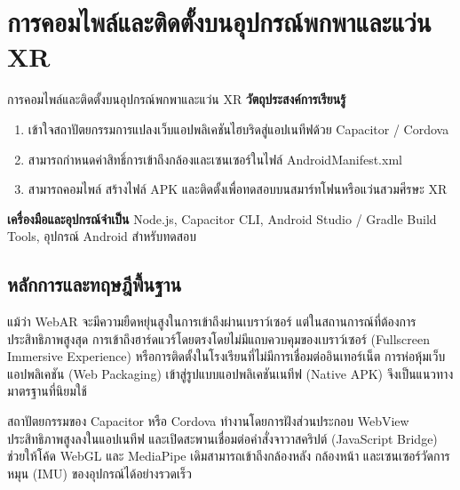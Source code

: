 
\chapter{การคอมไพล์และติดตั้งบนอุปกรณ์พกพาและแว่น XR}
\label{ch:lab08}


\vspace{0.4cm}

\begin{labobjectivebox}{การคอมไพล์และติดตั้งบนอุปกรณ์พกพาและแว่น XR}
\textbf{วัตถุประสงค์การเรียนรู้}
\begin{enumerate}[leftmargin=1.8cm, itemsep=2pt]
    \item เข้าใจสถาปัตยกรรมการแปลงเว็บแอปพลิเคชันไฮบริดสู่แอปเนทีฟด้วย Capacitor / Cordova
    \item สามารถกำหนดค่าสิทธิ์การเข้าถึงกล้องและเซนเซอร์ในไฟล์ AndroidManifest.xml
    \item สามารถคอมไพล์ สร้างไฟล์ APK และติดตั้งเพื่อทดสอบบนสมาร์ทโฟนหรือแว่นสวมศีรษะ XR
\end{enumerate}

\vspace{4pt}
\textbf{เครื่องมือและอุปกรณ์จำเป็น} \enspace Node.js, Capacitor CLI, Android Studio / Gradle Build Tools, อุปกรณ์ Android สำหรับทดสอบ
\end{labobjectivebox}

\section{หลักการและทฤษฎีพื้นฐาน}

แม้ว่า WebAR จะมีความยืดหยุ่นสูงในการเข้าถึงผ่านเบราว์เซอร์ แต่ในสถานการณ์ที่ต้องการประสิทธิภาพสูงสุด การเข้าถึงฮาร์ดแวร์โดยตรงโดยไม่มีแถบควบคุมของเบราว์เซอร์ (Fullscreen Immersive Experience) หรือการติดตั้งในโรงเรียนที่ไม่มีการเชื่อมต่ออินเทอร์เน็ต การห่อหุ้มเว็บแอปพลิเคชัน (Web Packaging) เข้าสู่รูปแบบแอปพลิเคชันเนทีฟ (Native APK) จึงเป็นแนวทางมาตรฐานที่นิยมใช้

สถาปัตยกรรมของ Capacitor หรือ Cordova ทำงานโดยการฝังส่วนประกอบ WebView ประสิทธิภาพสูงลงในแอปเนทีฟ และเปิดสะพานเชื่อมต่อคำสั่งจาวาสคริปต์ (JavaScript Bridge) ช่วยให้โค้ด WebGL และ MediaPipe เดิมสามารถเข้าถึงกล้องหลัง กล้องหน้า และเซนเซอร์วัดการหมุน (IMU) ของอุปกรณ์ได้อย่างรวดเร็ว

